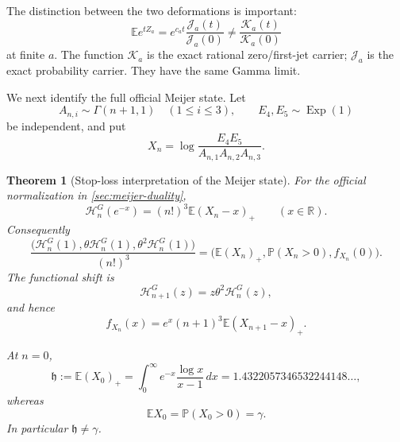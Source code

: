 \documentclass[11pt]{article}
\newtheorem{theorem}{Theorem}[section]
\theoremstyle{definition}
\theoremstyle{remark}
\newcommand{\R}{\mathbb R}
\newcommand{\Prob}{\mathbb P}
\begin{document}
The distinction between the two deformations is important:
\begin{equation}\label{eq:mgf-not-K}
 \mathbb Ee^{tZ_a}
 =e^{c_at}\frac{\mathscr J_a(t)}{\mathscr J_a(0)}
 \ne\frac{\mathscr K_a(t)}{\mathscr K_a(0)}
\end{equation}
at finite \(a\).  The function \(\mathscr K_a\) is the exact rational
zero/first-jet carrier; \(\mathscr J_a\) is the exact probability carrier.
They have the same Gamma limit.

We next identify the full official Meijer state.  Let
\begin{equation}\label{eq:Xn-def}
 A_{n,i}\sim\Gamma(n+1,1)\quad(1\le i\le3),\qquad
 E_4,E_5\sim\operatorname{Exp}(1)
\end{equation}
be independent, and put
\begin{equation}\label{eq:Xn-ratio}
 X_n=\log\frac{E_4E_5}{A_{n,1}A_{n,2}A_{n,3}}.
\end{equation}

\begin{theorem}[Stop-loss interpretation of the Meijer state]
\label{thm:meijer-probability}
For the official normalization in \cref{sec:meijer-duality},
\begin{equation}\label{eq:Meijer-stop-loss}
 \boxed{\displaystyle
 \mathcal H_n^G(e^{-x})=(n!)^3\mathbb E(X_n-x)_+}
 \qquad(x\in\R).
\end{equation}
Consequently
\begin{equation}\label{eq:Meijer-state-probability}
 \boxed{\displaystyle
 \frac{\bigl(\mathcal H_n^G(1),\theta\mathcal H_n^G(1),
 \theta^2\mathcal H_n^G(1)\bigr)}{(n!)^3}
 =\bigl(\mathbb E(X_n)_+,\Prob(X_n>0),f_{X_n}(0)\bigr).}
\end{equation}
The functional shift is
\begin{equation}\label{eq:Meijer-functional-shift}
 \mathcal H_{n+1}^G(z)=z\theta^2\mathcal H_n^G(z),
\end{equation}
and hence
\begin{equation}\label{eq:probability-conservation}
 f_{X_n}(x)=e^x(n+1)^3\mathbb E(X_{n+1}-x)_+.
\end{equation}

At \(n=0\),
\begin{equation}\label{eq:h-constant}
 \mathfrak h:=\mathbb E(X_0)_+
 =\int_0^\infty e^{-x}\frac{\log x}{x-1}\,dx
 =1.4322057346532244148\ldots,
\end{equation}
whereas
\begin{equation}\label{eq:Powers-gamma}
 \mathbb EX_0=\Prob(X_0>0)=\gamma.
\end{equation}
In particular \(\mathfrak h\ne\gamma\).
\end{theorem}
\end{document}
